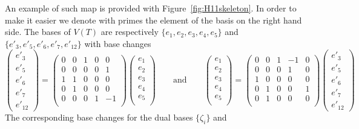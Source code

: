 \documentclass[a4paper,12pt]{article}
\begin{document}
An example of such map is provided with Figure~\ref{fig:H11skeleton}. In order to make
it easier we denote with primes the element of the basis on the right hand side. The
bases of $V(T)$ are respectively $\{e_1, e_2, e_3, e_4, e_5\}$ and
$\{e'_3, e'_5, e'_6, e'_7, e'_{12}\}$ with base changes
\[
\begin{pmatrix}
e'_3 \\
e'_5 \\
e'_6 \\
e'_7  \\
e'_{12}
\end{pmatrix}
=
\begin{pmatrix}
0 & 0 & 1 & 0 & 0 \\ %
0 & 0 & 0 & 0 & 1 \\ %
1 & 1 & 0 & 0 & 0 \\ %
0 & 1 & 0 & 0 & 0 \\ %
0 & 0 & 0 & 1 & -1 \\ %
\end{pmatrix}
\begin{pmatrix}
e_1 \\
e_2 \\
e_3 \\
e_4 \\
e_5 \\
\end{pmatrix}
\qquad \text{and} \qquad
\begin{pmatrix}
e_1 \\
e_2 \\
e_3 \\
e_4 \\
e_5 \\
\end{pmatrix}
=
\begin{pmatrix}
  0 & 0 & 1 & -1 & 0 \\ %
  0 & 0 & 0 & 1 & 0 \\ %
  1 & 0 & 0 & 0 & 0 \\ %
  0 & 1 & 0 & 0 & 1 \\ %
  0 & 1 & 0 & 0 & 0 \\ %
\end{pmatrix}
\begin{pmatrix}
e'_3 \\
e'_5 \\
e'_6 \\
e'_7  \\
e'_{12}
\end{pmatrix}
\]
The corresponding base changes for the dual bases $\{\zeta_i\}$ and
\end{document}
